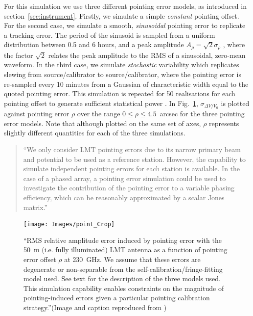 For this simulation we use three different pointing error models, as introduced in section~\ref{sec:instrument}. Firstly, we simulate a simple \emph{constant} pointing offset. For the second case, we simulate a smooth, \emph{sinusoidal} pointing error to replicate a tracking error. The period of the sinusoid is sampled from a uniform distribution between 0.5 and 6 hours, and a peak amplitude $A_{\rho} = \sqrt{2} \sigma_{\rho}$ , where the factor $\sqrt{2}$ relates the peak amplitude to the RMS of a sinusoidal, zero-mean waveform.  In the third case, we simulate \emph{stochastic} variability which replicates slewing from source/calibrator to source/calibrator, where the pointing error is re-sampled every 10 minutes from a Gaussian of characteristic width equal to the quoted pointing error. This simulation is repeated for 50 realisations for each pointing offset to generate sufficient statistical power \citep{Blecher_2016}. In Fig.~\ref{fig:pointing}, $\sigma_{\Delta V/V_0}$ is plotted against pointing error $\rho$ over the range $0 \le \rho \le 4.5$~arcsec for the three pointing error models. Note that although plotted on the same set of axes, $\rho$ represents slightly different quantities for each of the three simulations.

\begin{quotation}
``We only consider LMT pointing errors due to its narrow primary beam and potential to be used as a reference station. However, the capability to simulate independent pointing errors for each station is available. In the case of a phased array, a pointing error simulation could be used to investigate the contribution of the pointing error to a variable phasing efficiency, which can be reasonably approximated by a scalar Jones matrix.''\\
\citep{Blecher_2016}
\end{quotation}


\begin{figure}[h!]
\texttt{[image: Images/point\_Crop]}
\caption[RMS relative amplitude error induced by pointing error with the 50~m  LMT antenna as a function of pointing error offset $\rho$ at 230~GHz.]{``RMS relative amplitude error induced by pointing error with the 50~m (i.e. fully illuminated) LMT antenna as a function of pointing error offset $\rho$ at 230~GHz. We assume that these errors are degenerate or non-separable from the self-calibration/fringe-fitting model used. See text for the description of the three models used. This simulation capability enables constraints on the magnitude of pointing-induced errors given a particular pointing calibration strategy.''(Image and caption reproduced from \citet{Blecher_2016})\label{fig:pointing}%
}
\end{figure}
\

